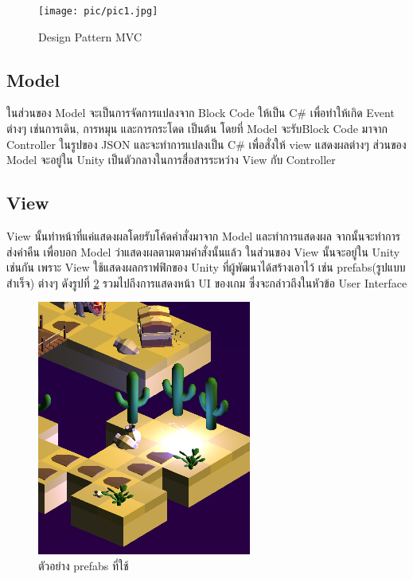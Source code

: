 \begin{figure}
\begin{center}
\texttt{[image: pic/pic1.jpg]}
\end{center}
\caption[Poem]{Design Pattern MVC}
\label{mvc}
\end{figure}

\subsection{Model}
 ในส่วนของ Model จะเป็นการจัดการแปลงจาก Block Code ให้เป็น C\# เพื่อทำให้เกิด Event ต่างๆ เช่นการเดิน, การหมุน
 และการกระโดด เป็นต้น โดยที่ Model จะรับBlock Code มาจาก Controller ในรูปของ JSON
 และจะทำการแปลงเป็น C\# เพื่อสั่งให้ view แสดงผลต่างๆ ส่วนของ Model จะอยู่ใน Unity
 เป็นตัวกลางในการสื่อสารระหว่าง View กับ Controller

\subsection{View}
View นั้นทำหน้าที่แค่แสดงผลโดยรับโค้ดคำสั่งมาจาก Model และทำการแสดงผล จากนั้นจะทำการ
ส่งค่าคืน เพื่อบอก Model ว่าแสดงผลตามตามคำสั่งนั้นแล้ว ในส่วนของ View นั้นจะอยู่ใน
Unity เช่นกัน เพราะ View ใช้แสดงผลกราฟฟิกของ Unity ที่ผู้พัฒนาได้สร้างเอาไว้ เช่น prefabs(รูปแบบสำเร็จ) ต่างๆ ดังรูปที่ \ref{prefabs}
รวมไปถึงการแสดงหน้า UI ของเกม ซึ่งจะกล่าวถึงในหัวข้อ User Interface\par

\begin{figure}
    \begin{center}
    \includegraphics{pic/prefap.PNG}
    \end{center}
    \caption[Poem]{ตัวอย่าง prefabs ที่ใช้ }
    \label{prefabs}
    \end{figure}
    


